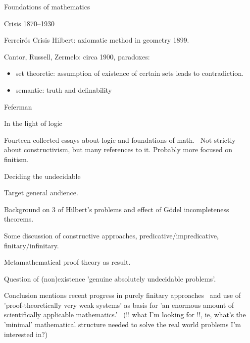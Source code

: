 \begin{plSection}{Foundations of mathematics}
\begin{plSection}{Crisis 1870--1930}
\begin{plSection}{Ferreir\'{o}s Crisis}
Hilbert: axiomatic method in geometry 1899.

Cantor, Russell, Zermelo: circa 1900, paradoxes:
\begin{itemize}
  \item set theoretic: assumption of existence of certain sets
  leads to contradiction.
  \item semantic: truth and definability
\end{itemize}

\end{plSection}%
\end{plSection}%
\begin{plSection}{Feferman}
\label{sec:Feferman}

\begin{plSection}{In the light of logic}
\label{sec:In_the_light_of_logic}

Fourteen collected essays about logic and foundations of 
math.~\cite{Feferman:1998:LightOfLogic}
Not strictly about constructivism, but many references to it.
Probably more focused on finitism.

\begin{plSection}{Deciding the undecidable}
\label{sec:Deciding_the_undecidable}

\cite[ch.~1 ``Deciding the undecidable'']{Feferman:1998:LightOfLogic}

Target general audience.

Background on $3$ of Hilbert's problems
and effect of G\"{o}del incompleteness theorems.

Some discussion of constructive approaches, 
predicative/impredicative, finitary/infinitary.

Metamathematical proof theory as result.

Question of (non)existence 
'genuine absolutely undecidable problems'.

Conclusion mentions recent progress
in purely finitary approaches~\cite[ch.~10]{Feferman:1998:LightOfLogic}
and 
use of 'proof-theoretically very weak systems'
as basis for 'an enormous amount of scientifically applicable
mathematics.'~\cite[ch.~14]{Feferman:1998:LightOfLogic}
(!! what I'm looking for !!, ie, 
what's the 'minimal' mathematical structure needed to
solve the real world problems I'm interested in?)


\end{plSection}
\end{plSection}
\end{plSection}
\end{plSection}
